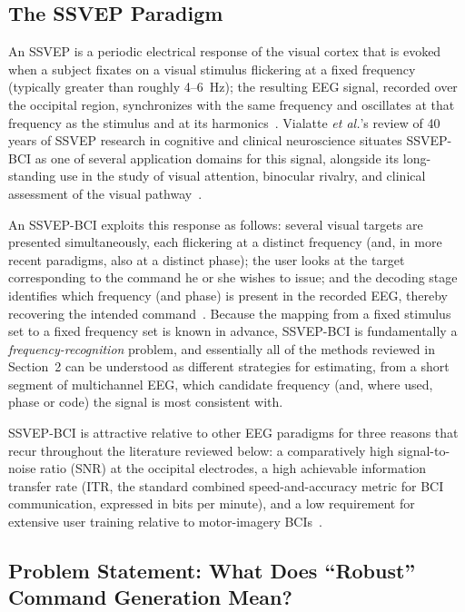 \documentclass[11pt]{article}
\begin{document}
\subsection{The SSVEP Paradigm}

An SSVEP is a periodic electrical response of the visual cortex that is evoked when a subject fixates on a visual stimulus flickering at a fixed frequency (typically greater than roughly 4--6~Hz); the resulting EEG signal, recorded over the occipital region, synchronizes with the same frequency and oscillates at that frequency as the stimulus and at its harmonics~\cite{vialatte2010ssvep}. Vialatte \textit{et al.}'s review of 40 years of SSVEP research in cognitive and clinical neuroscience situates SSVEP-BCI as one of several application domains for this signal, alongside its long-standing use in the study of visual attention, binocular rivalry, and clinical assessment of the visual pathway~\cite{vialatte2010ssvep}.

An SSVEP-BCI exploits this response as follows: several visual targets are presented simultaneously, each flickering at a distinct frequency (and, in more recent paradigms, also at a distinct phase); the user looks at the target corresponding to the command he or she wishes to issue; and the decoding stage identifies which frequency (and phase) is present in the recorded EEG, thereby recovering the intended command~\cite{lin2007cca}. Because the mapping from a fixed stimulus set to a fixed frequency set is known in advance, SSVEP-BCI is fundamentally a \emph{frequency-recognition} problem, and essentially all of the methods reviewed in Section~2 can be understood as different strategies for estimating, from a short segment of multichannel EEG, which candidate frequency (and, where used, phase or code) the signal is most consistent with.

SSVEP-BCI is attractive relative to other EEG paradigms for three reasons that recur throughout the literature reviewed below: a comparatively high signal-to-noise ratio (SNR) at the occipital electrodes, a high achievable information transfer rate (ITR, the standard combined speed-and-accuracy metric for BCI communication, expressed in bits per minute), and a low requirement for extensive user training relative to motor-imagery BCIs~\cite{li2024sutl}.

\subsection{Problem Statement: What Does ``Robust'' Command Generation Mean?}
\end{document}
